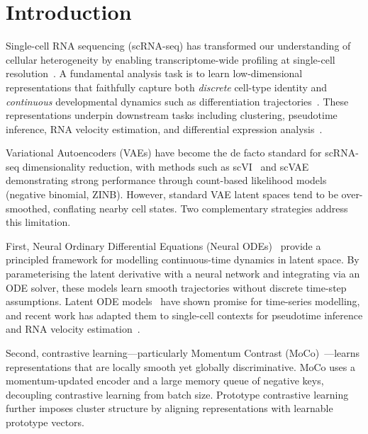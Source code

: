 \documentclass[biology,article,submit,pdftex]{Definitions/mdpi}
\begin{document}
\section{Introduction}
\label{sec:introduction}

Single-cell RNA sequencing (scRNA-seq) has transformed our understanding of cellular heterogeneity by enabling transcriptome-wide profiling at single-cell resolution~\cite{tang2009mrna}. A fundamental analysis task is to learn low-dimensional representations that faithfully capture both \textit{discrete} cell-type identity and \textit{continuous} developmental dynamics such as differentiation trajectories~\cite{kiselev2019challenges,trapnell2014dynamics}. These representations underpin downstream tasks including clustering, pseudotime inference, RNA velocity estimation, and differential expression analysis~\cite{wolf2018scanpy}.

Variational Autoencoders (VAEs) have become the de facto standard for scRNA-seq dimensionality reduction, with methods such as scVI~\cite{lopez2018deep} and scVAE~\cite{gronbech2020scvae} demonstrating strong performance through count-based likelihood models (negative binomial, ZINB). However, standard VAE latent spaces tend to be over-smoothed, conflating nearby cell states. Two complementary strategies address this limitation.

First, Neural Ordinary Differential Equations (Neural ODEs)~\cite{chen2018neural} provide a principled framework for modelling continuous-time dynamics in latent space. By parameterising the latent derivative with a neural network and integrating via an ODE solver, these models learn smooth trajectories without discrete time-step assumptions. Latent ODE models~\cite{rubanova2019latent} have shown promise for time-series modelling, and recent work has adapted them to single-cell contexts for pseudotime inference and RNA velocity estimation~\cite{fu2025panode}.

Second, contrastive learning---particularly Momentum Contrast (MoCo)~\cite{he2020momentum}---learns representations that are locally smooth yet globally discriminative. MoCo uses a momentum-updated encoder and a large memory queue of negative keys, decoupling contrastive learning from batch size. Prototype contrastive learning~\cite{li2021prototypical} further imposes cluster structure by aligning representations with learnable prototype vectors.
\end{document}

